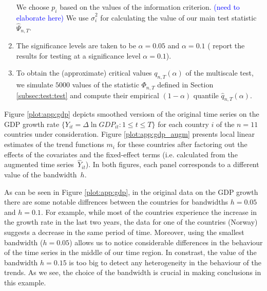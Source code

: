 \documentclass[a4paper,12pt]{article}
\begin{document}
\begin{enumerate}
We choose $p_i$ based on the values of the information criterion. \textcolor{blue}{(need to elaborate here)} We use $\hat{\sigma}^2_i$ for calculating the value of our main test statistic $\widehat{\Psi}_{n, T}$. %
\item The significance levels are taken to be $\alpha = 0.05$ and $\alpha = 0.1$ (\citet{Zhang2012} report the results for testing at a significance level $\alpha = 0.1$).
\item To obtain the (approximate) critical values $q_{n, T}(\alpha)$ of the multiscale test, we simulate $5000$ values of the statistic $\Phi_{n, T}$ defined in Section \ref{subsec:test:test} and compute their empirical $(1-\alpha)$ quantile $\hat{q}_{n, T}(\alpha)$.
\end{enumerate}



Figure \ref{plot:app:gdp} depicts smoothed versiosn of the original time series on the GDP growth rate $\{Y_{it} = \Delta \ln GDP_{it}: 1 \le t \le T\}$ for each country $i$ of the $n=11$ countries under consideration. Figure \ref{plot:app:gdp_augm} presents local linear estimates of the trend functions $m_i$ for these countries after factoring out the effects of the covariates and the fixed-effect terms (i.e. calculated from the augmented time series~$\widehat{Y}_{it}$). In both figures, each panel corresponds to a different value of the bandwidth~$h$.

As can be seen in Figure \ref{plot:app:gdp}, in the original data on the GDP growth there are some notable diffrences between the countries for bandwidths $h = 0.05$ and $h = 0.1$. For example, while most of the countries experience the increase in the growth rate in the last two years, the data for one of the countries (Norway) suggests a decrease in the same period of time. Moreover, using the smallest bandwidth ($h= 0.05$) allows us to notice considerable differences in the behaviour of the time series in the middle of our time region. In constrast, the value of the bandwidth $h = 0.15$ is too big to detect any heterogeneity in the behaviour of the trends. As we see, the choice of the bandwidth is crucial in making conclusions in this example.
\end{document}
